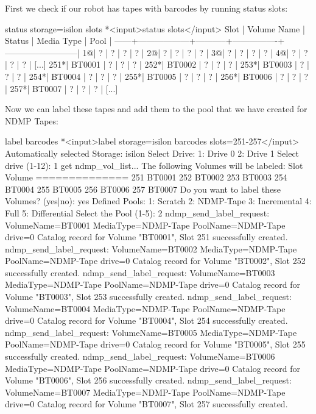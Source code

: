 First we check if our robot has tapes with barcodes by running status slots:

\begin{bconsole}{status storage=isilon slots}
*<input>status slots</input>
 Slot |   Volume Name    |   Status  |  Media Type    |         Pool             |
------+------------------+-----------+----------------+--------------------------|
    1@|                ? |         ? |              ? |                        ? |
    2@|                ? |         ? |              ? |                        ? |
    3@|                ? |         ? |              ? |                        ? |
    4@|                ? |         ? |              ? |                        ? |
[...]
  251*|           BT0001 |         ? |              ? |                        ? |
  252*|           BT0002 |         ? |              ? |                        ? |
  253*|           BT0003 |         ? |              ? |                        ? |
  254*|           BT0004 |         ? |              ? |                        ? |
  255*|           BT0005 |         ? |              ? |                        ? |
  256*|           BT0006 |         ? |              ? |                        ? |
  257*|           BT0007 |         ? |              ? |                        ? |
[...]
\end{bconsole}


Now we can label these tapes and add them to the pool that we have created for NDMP Tapes:

\begin{bconsole}{label barcodes}
*<input>label storage=isilon barcodes slots=251-257</input>
Automatically selected Storage: isilon
Select Drive:
     1: Drive 0
     2: Drive 1
Select drive (1-12): 1
get ndmp_vol_list...
The following Volumes will be labeled:
Slot  Volume
==============
 251  BT0001
 252  BT0002
 253  BT0003
 254  BT0004
 255  BT0005
 256  BT0006
 257  BT0007
Do you want to label these Volumes? (yes|no): yes
Defined Pools:
     1: Scratch
     2: NDMP-Tape
     3: Incremental
     4: Full
     5: Differential
Select the Pool (1-5): 2
ndmp_send_label_request: VolumeName=BT0001 MediaType=NDMP-Tape PoolName=NDMP-Tape drive=0
Catalog record for Volume "BT0001", Slot 251 successfully created.
ndmp_send_label_request: VolumeName=BT0002 MediaType=NDMP-Tape PoolName=NDMP-Tape drive=0
Catalog record for Volume "BT0002", Slot 252 successfully created.
ndmp_send_label_request: VolumeName=BT0003 MediaType=NDMP-Tape PoolName=NDMP-Tape drive=0
Catalog record for Volume "BT0003", Slot 253 successfully created.
ndmp_send_label_request: VolumeName=BT0004 MediaType=NDMP-Tape PoolName=NDMP-Tape drive=0
Catalog record for Volume "BT0004", Slot 254 successfully created.
ndmp_send_label_request: VolumeName=BT0005 MediaType=NDMP-Tape PoolName=NDMP-Tape drive=0
Catalog record for Volume "BT0005", Slot 255 successfully created.
ndmp_send_label_request: VolumeName=BT0006 MediaType=NDMP-Tape PoolName=NDMP-Tape drive=0
Catalog record for Volume "BT0006", Slot 256 successfully created.
ndmp_send_label_request: VolumeName=BT0007 MediaType=NDMP-Tape PoolName=NDMP-Tape drive=0
Catalog record for Volume "BT0007", Slot 257 successfully created.
\end{bconsole}

